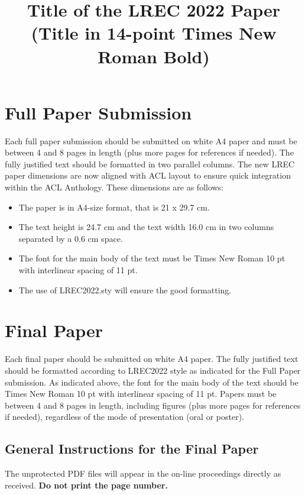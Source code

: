 \documentclass[10pt, a4paper]{article}
\title{Title of the LREC 2022 Paper (Title in 14-point Times New Roman Bold)\\ \vspace*{.5\baselineskip} \normalfont{ The Title \ul{Must Be} Capitalised as in:\\ \vspace*{.5\baselineskip} \textbf{The Rise and Fall of Ziggy Stardust and the Spiders from Mars}}}
\begin{document}
\maketitleabstract

\section{Full Paper Submission}

Each full paper submission should be submitted on white A4 paper and must be between 4 and 8 pages in length (plus more pages for references if needed). 
The fully justified text should be formatted in two parallel columns. The new LREC paper dimensions are now aligned with ACL layout to ensure quick integration within the ACL Anthology. These dimensions are as follows:   
\begin{itemize}
    \item{The paper is in A4-size format, that is 21 x 29.7 cm.}
    \item{The text height is 24.7 cm and the text width 16.0 cm in two columns separated by a 0.6 cm space.}
     \item {The font for the main body of the text must be Times New Roman 10 pt with interlinear spacing of 11 pt.}
     \item {The use of LREC2022.sty will ensure the good formatting.}
 \end{itemize}


\section{ Final Paper}

Each final paper should be submitted on white A4 paper. The fully justified text should be formatted according to LREC2022 style as indicated for the Full Paper submission.
As indicated above, the font for the main body of the text should be Times  New Roman 10 pt with interlinear spacing of 11 pt. Papers must be between 4 and 8 pages in length, including figures (plus more pages for references if needed), regardless of the mode of presentation (oral or poster).


\subsection{General Instructions for the Final Paper}
The unprotected PDF files will appear in the on-line proceedings directly as received. \textbf{Do not print the page number.}
\end{document}
